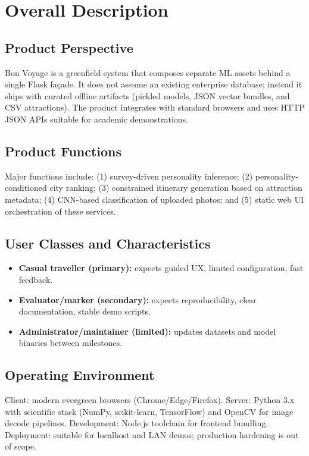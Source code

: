 \documentclass[12pt,oneside,openany]{report}
\begin{document}
\section{Overall Description}

\subsection{Product Perspective}
Bon Voyage is a greenfield system that composes separate ML assets behind a single Flask façade. It does not assume an existing enterprise database; instead it ships with curated offline artifacts (pickled models, JSON vector bundles, and CSV attractions). The product integrates with standard browsers and uses HTTP JSON APIs suitable for academic demonstrations.

\subsection{Product Functions}
Major functions include: (1) survey-driven personality inference; (2) personality-conditioned city ranking; (3) constrained itinerary generation based on attraction metadata; (4) CNN-based classification of uploaded photos; and (5) static web UI orchestration of these services.

\subsection{User Classes and Characteristics}
\begin{itemize}[nosep]
\item \textbf{Casual traveller (primary):} expects guided UX, limited configuration, fast feedback.
\item \textbf{Evaluator/marker (secondary):} expects reproducibility, clear documentation, stable demo scripts.
\item \textbf{Administrator/maintainer (limited):} updates datasets and model binaries between milestones.
\end{itemize}

\subsection{Operating Environment}
Client: modern evergreen browsers (Chrome/Edge/Firefox). Server: Python 3.x with scientific stack (NumPy, scikit-learn, TensorFlow) and OpenCV for image decode pipelines. Development: Node.js toolchain for frontend bundling. Deployment: suitable for localhost and LAN demos; production hardening is out of scope.
\end{document}
